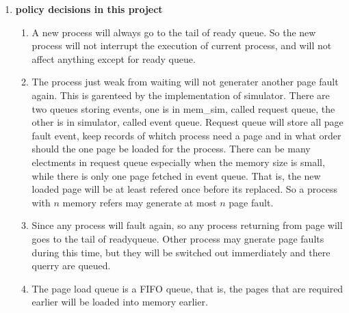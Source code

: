 \documentclass[12pt,a4paper]{article}
\begin{document}
\begin{enumerate}[\bf I]
		\item \textbf{policy decisions in this project}
			\begin{enumerate}
				\item A new process will always go to the tail of ready queue. So the new process will not interrupt the execution of current process, and will not affect anything except for ready queue.
				\item The process just weak from waiting will not generater another page fault again. This is garenteed by the implementation of simulator. There are two queues storing events, one is in mem\_sim, called request queue, the other is in simulator, called event queue. Request queue will store all page fault event, keep records of whitch process need a page and in what order should the one page be loaded for the process. There can be many electments  in request queue especially when the memory size is small, while there is only one page fetched in event queue. That is, the new loaded page will be at least refered once before its replaced. So a process with $n$ memory refers may generate at most $n$ page fault.
				\item Since any process will fault again, so any process returning from page will goes to the tail of readyqueue. Other process may gnerate page faults during this time, but they will be switched out immerdiately and there querry are queued.
				\item The page load queue is a FIFO queue, that is, the pages that are required earlier will be loaded into memory earlier.
			\end{enumerate}
	\end{enumerate}
	    	
\end{document}
